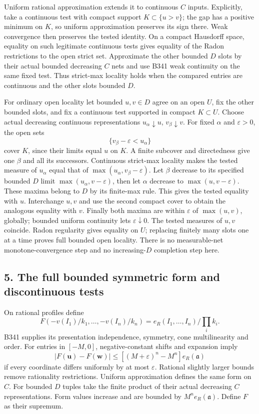 \documentclass[
]{article}
\begin{document}
Uniform rational approximation extends it to continuous \(C\) inputs.
Explicitly, take a continuous test with compact support
\(K\subset\{u>v\}\); the gap has a positive minimum on \(K\), so uniform
approximation preserves its sign there. Weak convergence then preserves
the tested identity. On a compact Hausdorff space, equality on such
legitimate continuous tests gives equality of the Radon restrictions to
the open strict set. Approximate the other bounded \(D\) slots by their
actual bounded decreasing \(C\) nets and use B341 weak continuity on the
same fixed test. Thus strict-max locality holds when the compared
entries are continuous and the other slots bounded \(D\).

For ordinary open locality let bounded \(u,v\in D\) agree on an open
\(U\), fix the other bounded slots, and fix a continuous test supported
in compact \(K\subset U\). Choose actual decreasing continuous
representations \(u_\alpha\downarrow u\), \(v_\beta\downarrow v\). For
fixed \(\alpha\) and \(\varepsilon>0\), the open sets
\[\{v_\beta-\varepsilon<u_\alpha\}\] cover \(K\), since their limits
equal \(u\) on \(K\). A finite subcover and directedness give one
\(\beta\) and all its successors. Continuous strict-max locality makes
the tested measure of \(u_\alpha\) equal that of
\(\max(u_\alpha,v_\beta-\varepsilon)\). Let \(\beta\) decrease to its
specified bounded \(D\) limit \(\max(u_\alpha,v-\varepsilon)\), then let
\(\alpha\) decrease to \(\max(u,v-\varepsilon)\). These maxima belong to
\(D\) by its finite-max rule. This gives the tested equality with \(u\).
Interchange \(u,v\) and use the second compact cover to obtain the
analogous equality with \(v\). Finally both maxima are within
\(\varepsilon\) of \(\max(u,v)\), globally; bounded uniform continuity
lets \(\varepsilon\downarrow0\). The tested measures of \(u,v\)
coincide. Radon regularity gives equality on \(U\); replacing finitely
many slots one at a time proves full bounded open locality. There is no
measurable-net monotone-convergence step and no increasing-\(D\)
completion step here.

\subsection{5. The full bounded symmetric form and discontinuous
tests}\label{the-full-bounded-symmetric-form-and-discontinuous-tests}

On rational profiles define
\[F(-v(I_1)/k_1,\ldots,-v(I_n)/k_n)=e_R(I_1,\ldots,I_n)/\prod_i k_i.\]
B341 supplies its presentation independence, symmetry, cone
multilinearity and order. For entries in \([-M,0]\), negative-constant
shifts and expansion imply
\[|F(\boldsymbol u)-F(\boldsymbol w)|\le[(M+\varepsilon)^n-M^n]e_R(\mathfrak a)\]
if every coordinate differs uniformly by at most \(\varepsilon\).
Rational slightly larger bounds remove rationality restrictions. Uniform
approximation defines the same form on \(C\). For bounded \(D\) tuples
take the finite product of their actual decreasing \(C\)
representations. Form values increase and are bounded by
\(M^n e_R(\mathfrak a)\). Define \(F\) as their supremum.
\end{document}
